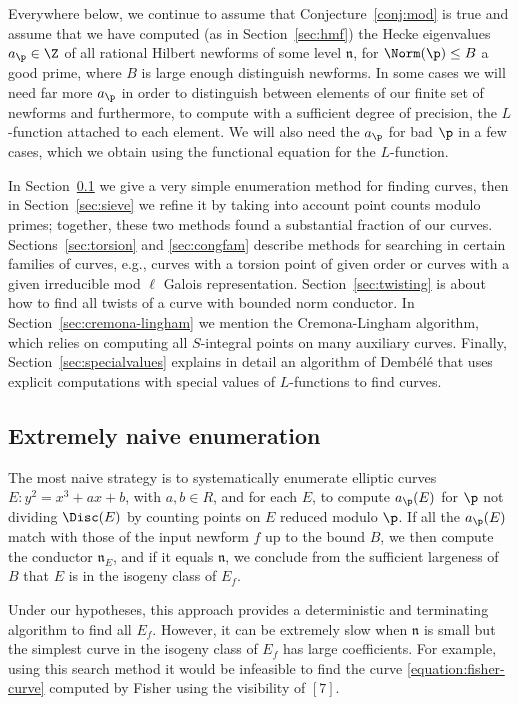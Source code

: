 \documentclass{amsart}
\newcommand{\n}{\mathfrak{n}}
\newcommand{\dembele}{Demb\'el{\'e}\xspace}
\begin{document}
Everywhere below, we continue to assume that Conjecture~\ref{conj:mod}
is true and assume that we have computed (as in Section~\ref{sec:hmf})
the Hecke eigenvalues $a_\p\in \Z$ of all rational Hilbert newforms of
some level $\n$, for $\Norm(\p)\leq B$ a good prime, where $B$ is
large enough distinguish newforms. In some cases we will need far more
$a_{\p}$ in order to distinguish between elements of our finite set of
newforms and furthermore, to compute with a sufficient degree of
precision, the $L$-function attached to each element.  We will also
need the $a_{\p}$ for bad $\p$ in a few cases, which we obtain
using the functional equation for the $L$-function.

In Section~\ref{sec:naive} we give a very simple enumeration method
for finding curves, then in Section~\ref{sec:sieve} we refine it by
taking into account point counts modulo primes; together, these two
methods found a substantial fraction of our curves.
Sections~\ref{sec:torsion} and \ref{sec:congfam} describe methods for
searching in certain families of curves, e.g., curves with a torsion
point of given order or curves with a given irreducible mod $\ell$
Galois representation.  Section~\ref{sec:twisting} is about how to
find all twists of a curve with bounded norm conductor.  In
Section~\ref{sec:cremona-lingham} we mention the Cremona-Lingham
algorithm, which relies on computing all $S$-integral points on many
auxiliary curves.  Finally, Section~\ref{sec:specialvalues} explains
in detail an algorithm of \dembele{} that uses  explicit
computations with special values of $L$-functions to find curves.


\subsection{Extremely naive enumeration}\label{sec:naive}

The most naive strategy is to systematically enumerate 
 elliptic curves $E: y^2 = x^3 + ax + b$, with $a,b\in R$,
and for each $E$, to compute $a_\p(E)$ for $\p$ not dividing $\Disc(E)$
 by counting points on $E$ reduced modulo $\p$.  If all the $a_\p(E)$ match
 with those of the input newform $f$ up to the bound $B$, we then compute
 the conductor $\n_E$, and if it equals $\n$, we conclude from the sufficient 
largeness of $B$ that $E$ is in the isogeny class of $E_f$.

Under our hypotheses, this approach provides a deterministic and 
terminating algorithm to find all $E_f$. However, it can be extremely slow
 when $\n$ is small but the simplest curve in the isogeny class 
of $E_f$ has large coefficients.  For example, using this search method it would be infeasible to find the curve \eqref{equation:fisher-curve}
computed by Fisher using the visibility of \Sha$[7]$.
\end{document}

